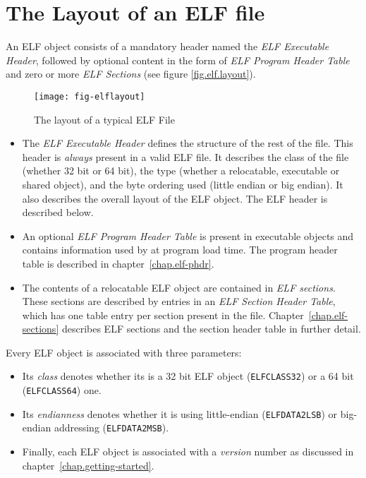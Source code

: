 \documentclass[a4paper]{book}
\newcommand{\constant}[1]{\texttt{#1}}
\newcommand{\firstterm}[1]{\textit{#1}}                 %
\begin{document}
\section{The Layout of an ELF file}

An ELF object consists of a mandatory header named the \firstterm{ELF
  Executable Header}, followed by optional content in the form of
\firstterm{ELF Program Header Table} and zero or more \firstterm{ELF
  Sections} (see figure \vref{fig.elf.layout}).

\begin{figure}
  \caption{The layout of a typical ELF File}\label{fig.elf.layout}
  \begin{center}
    \texttt{[image: fig-elflayout]}
  \end{center}
\end{figure}

\begin{itemize}
\item The \firstterm{ELF Executable Header} defines the structure of
  the rest of the file.  This header is \emph{always} present in a
  valid ELF file.  It describes the class of the file (whether 32 bit
  or 64 bit), the type (whether a relocatable, executable or shared
  object), and the byte ordering used (little endian or big endian).
  It also describes the overall layout of the ELF object.  The ELF
  header is described below.

\item An optional \firstterm{ELF Program Header Table} is present in
  executable objects and contains information used by at program load
  time.  The program header table is described in
  chapter~\vref{chap.elf-phdr}.

\item The contents of a relocatable ELF object are contained in
  \firstterm{ELF sections}.  These sections are described by entries
  in an \firstterm{ELF Section Header Table}, which has one table
  entry per section present in the file.
  Chapter~\vref{chap.elf-sections} describes ELF sections and the
  section header table in further detail.
\end{itemize}

Every ELF object is associated with three parameters:

\begin{itemize}
\item Its \firstterm{class} denotes whether its is a 32 bit ELF object
  (\constant{ELFCLASS32}) or a 64 bit (\constant{ELFCLASS64}) one.
\item Its \firstterm{endianness} denotes whether it is using
  little-endian (\constant{ELFDATA2LSB}) or big-endian addressing
  (\constant{ELFDATA2MSB}).
\item Finally, each ELF object is associated with a
  \firstterm{version} number as discussed in
  chapter~\vref{chap.getting-started}.
\end{itemize}
\end{document}
